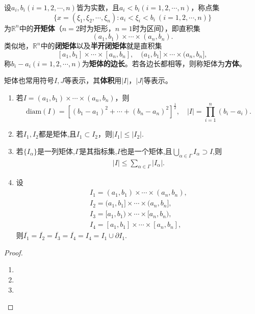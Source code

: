 \documentclass[../../main.tex]{subfiles}%
\begin{document}
\begin{definition}[矩体]
设\(a_i,b_i(i = 1,2,\cdots,n)\)皆为实数，且\(a_i < b_i(i = 1,2,\cdots,n)\)，称点集
\[\{x = (\xi_1,\xi_2,\cdots,\xi_n):a_i<\xi_i < b_i\ (i = 1,2,\cdots,n)\}\]
为\(\mathbb{R}^n\)中的\textbf{开矩体}（\(n = 2\)时为矩形，\(n = 1\)时为区间），即直积集
\[(a_1,b_1)\times\cdots\times(a_n,b_n).\]
类似地，\(\mathbb{R}^n\)中的\textbf{闭矩体}以及\textbf{半开闭矩体}就是直积集
\[[a_1,b_1]\times\cdots\times[a_n,b_n],\quad(a_1,b_1]\times\cdots\times(a_n,b_n],\]
称\(b_i - a_i(i = 1,2,\cdots,n)\)为\textbf{矩体的边长}。若各边长都相等，则称矩体为\textbf{方体}。

矩体也常用符号\(I,J\)等表示，其\textbf{体积}用\(|I|\)，\(|J|\)等表示。
\end{definition}

\begin{proposition}[矩体的性质]\label{proposition:矩体的性质}
\begin{enumerate}[(1)]
\item 若\(I=(a_1,b_1)\times\cdots\times(a_n,b_n)\)，则
\[\text{diam}(I)=[(b_1 - a_1)^2+\cdots+(b_n - a_n)^2]^{\frac{1}{2}},\quad |I|=\prod_{i = 1}^{n}(b_i - a_i).\]

\item 若\(I_1,I_2\)都是矩体,且$I_1\subset I_2$，则$|I_1|\leqslant |I_2|$.

\item 若$\{I_\alpha\}$是一列矩体,$\Gamma$是其指标集,$I$也是一个矩体,且$\bigcup_{\alpha\in \Gamma}I_\alpha \supset I$,则
\begin{align*}
|I|\leqslant \sum_{\alpha\in \Gamma}|I_\alpha|.
\end{align*}

\item 设
\begin{gather*}
I_1=(a_1,b_1)\times \cdots \times (a_n,b_n),
\\
I_2=(a_1,b_1]\times \cdots \times (a_n,b_n],
\\
I_3=[a_1,b_1)\times \cdots \times [a_n,b_n),
\\
I_4=[a_1,b_1]\times \cdots \times [a_n,b_n],
\end{gather*}
则$\overline{I_1}=\overline{I_2}=\overline{I_3}=\overline{I_4}=I_4=I_1\cup \partial I_1$.
\end{enumerate}
\end{proposition}
\begin{proof}
\begin{enumerate}[(1)]
\item 

\item 

\item 
\end{enumerate}

\end{proof}
\end{document}
